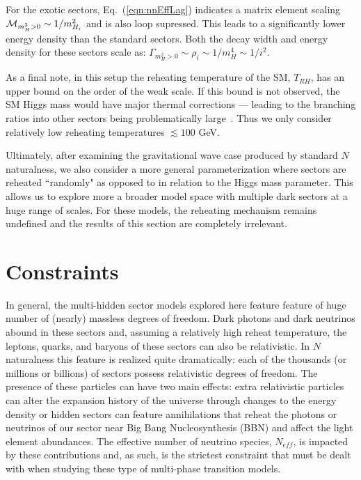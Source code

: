 \documentclass[nofootinbib,twocolumn,preprintnumbers]{revtex4-1}
\begin{document}
For the exotic sectors, Eq.~(\ref{eqn:nnEffLag}) indicates a matrix element scaling ${\cal M}_{m_H^2>0} \sim 1/m_{H_i}^2$ and is also loop supressed. 
This leads to a significantly lower energy density than the standard sectors. Both the decay width and energy density for these sectors scale as: $\Gamma_{m_H^2>0} \sim \rho_i \sim 1/m_H^4 \sim 1/i^2$. 

As a final note, in this setup the reheating temperature of the SM, $T_{RH}$, has an upper bound on the order of the weak scale. If this bound is not observed, the SM Higgs mass would have major thermal corrections --- leading to the branching ratios into other sectors being problematically large~\citep{Arkani-Hamed:2016rle}. Thus we only consider relatively low reheating temperatures $\lesssim 100$ GeV.

Ultimately, after examining the gravitational wave case produced by standard $N$naturalness, we also consider a more general parameterization where sectors are reheated ``randomly" as opposed to in relation to the Higgs mass parameter. This allows us to explore more a broader model space with multiple dark sectors at a huge range of scales. For these models, the reheating mechanism remains undefined and the results of this section are completely irrelevant. 


\section{Constraints}
\label{sec:constraints}



In general, the multi-hidden sector models explored here feature feature of huge number of (nearly) massless degrees of freedom. Dark photons and dark neutrinos abound in these sectors and, assuming a relatively high reheat temperature, the leptons, quarks, and baryons of these sectors can also  be relativistic. In $N$naturalness this feature is realized quite dramatically: each of the thousands (or millions or billions) of sectors possess relativistic degrees of freedom. The presence of these particles can have two main effects: extra relativistic particles can alter the expansion history of the universe through changes to the energy density or hidden sectors can feature annihilations that reheat the photons or neutrinos of our sector near Big Bang Nucleosynthesis (BBN) and affect the light element abundances. The effective number of neutrino species, $N_{eff}$, is impacted by these contributions and, as such, is the strictest constraint that must be dealt with when studying these type of multi-phase transition models. 
\end{document}

